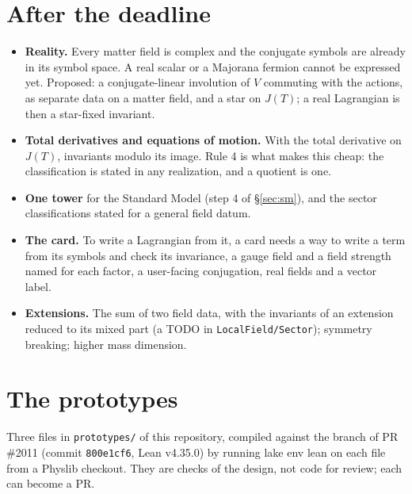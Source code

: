 \documentclass[11pt,a4paper]{article}
\newcommand{\lean}[1]{{\footnotesize\upshape\ttfamily\nolinkurl{#1}}}
\newcommand{\file}[1]{{\small\ttfamily\nolinkurl{#1}}}
\begin{document}
\section{After the deadline}\label{sec:later}

\begin{itemize}[itemsep=1pt]
\item \textbf{Reality.} Every matter field is complex and the conjugate symbols are already in its symbol space. A real scalar or a Majorana fermion cannot be expressed yet. Proposed: a conjugate-linear involution of $V$ commuting with the actions, as separate data on a matter field, and a star on $J(T)$; a real Lagrangian is then a star-fixed invariant.
\item \textbf{Total derivatives and equations of motion.} With the total derivative on $J(T)$, invariants modulo its image. Rule 4 is what makes this cheap: the classification is stated in any realization, and a quotient is one.
\item \textbf{One tower} for the Standard Model (step 4 of \S\ref{sec:sm}), and the sector classifications stated for a general field datum.
\item \textbf{The card.} To write a Lagrangian from it, a card needs a way to write a term from its symbols and check its invariance, a gauge field and a field strength named for each factor, a user-facing conjugation, real fields and a vector label.
\item \textbf{Extensions.} The sum of two field data, with the invariants of an extension reduced to its mixed part (a TODO in \lean{LocalField/Sector}); symmetry breaking; higher mass dimension.
\end{itemize}

\appendix
\section{The prototypes}

Three files in \file{prototypes/} of this repository, compiled against the branch of PR \#2011 (commit \lean{800e1cf6}, Lean v4.35.0) by running {\footnotesize\ttfamily lake env lean} on each file from a Physlib checkout. They are checks of the design, not code for review; each can become a PR.
\end{document}
